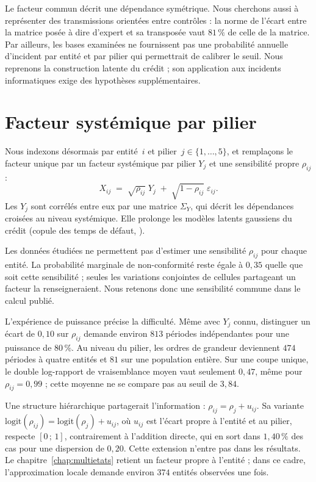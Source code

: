 Le facteur commun décrit une dépendance symétrique. Nous cherchons aussi à représenter
des transmissions orientées entre contrôles : la norme de l'écart entre la matrice posée
à dire d'expert et sa transposée vaut $81\,\%$ de celle de la matrice. Par ailleurs, les bases
examinées ne fournissent pas une probabilité annuelle d'incident par entité et par pilier
qui permettrait de calibrer le seuil. Nous reprenons la construction latente du crédit ;
son application aux incidents informatiques exige des hypothèses supplémentaires.


\section{Facteur systémique par pilier}

Nous indexons désormais par entité~$i$ et pilier~$j\in\{1,\dots,5\}$, et remplaçons le facteur
unique par un facteur systémique par pilier $Y_j$ et une sensibilité propre $\rho_{ij}$ :
\begin{equation}
X_{ij} \;=\; \sqrt{\rho_{ij}}\;Y_j \;+\; \sqrt{1-\rho_{ij}}\;\varepsilon_{ij}.
\end{equation}
Les $Y_j$ sont corrélés entre eux par une matrice $\Sigma_Y$, qui décrit les dépendances croisées
au niveau systémique. Elle prolonge les modèles latents gaussiens du crédit (copule des temps de défaut, \citet{Li2000}).

Les données étudiées ne permettent pas d'estimer une sensibilité $\rho_{ij}$ pour chaque entité.
La probabilité marginale de non-conformité reste égale à $0{,}35$ quelle que soit cette sensibilité ;
seules les variations conjointes de cellules partageant un facteur la renseigneraient.
Nous retenons donc une sensibilité commune dans le calcul publié.

L'expérience de puissance précise la difficulté. Même avec $Y_j$ connu, distinguer un écart de
$0{,}10$ sur $\rho_{ij}$ demande environ $813$ périodes indépendantes pour une puissance de $80\,\%$.
Au niveau du pilier, les ordres de grandeur deviennent $474$ périodes à quatre entités et $81$
sur une population entière. Sur une coupe unique, le double log-rapport de vraisemblance moyen
vaut seulement $0{,}47$, même pour $\rho_{ij}=0{,}99$ ; cette moyenne ne se compare pas au seuil de $3{,}84$.

Une structure hiérarchique partagerait l'information : $\rho_{ij}=\rho_j+u_{ij}$.
Sa variante $\mathrm{logit}(\rho_{ij})=\mathrm{logit}(\rho_j)+u_{ij}$, où $u_{ij}$ est l'écart propre à l'entité et au pilier, respecte $[0\,;\,1]$,
contrairement à l'addition directe, qui en sort dans $1{,}40\,\%$ des cas pour une dispersion de $0{,}20$.
Cette extension n'entre pas dans les résultats. Le chapitre~\ref{chap:multietats} retient un facteur
propre à l'entité ; dans ce cadre, l'approximation locale demande environ $374$ entités observées une fois.

